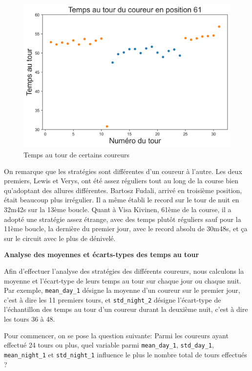 \documentclass[a4paper,12pt]{article}
\begin{document}
\begin{figure}[!h]
		\includegraphics[scale=0.45]{tempstour61}
	\caption{Temps au tour de certains coureurs}
\end{figure}

\medskip
On remarque que les stratégies sont différentes d'un coureur à l'autre. Les deux premiers, Lewis et Verys, ont été assez réguliers tout au long de la course bien qu'adoptant des allures différentes. Bartosz Fudali, arrivé en troisième position, était beaucoup plus irrégulier. Il a même établi le record sur le tour de nuit en 32m42s sur la 13ème boucle. Quant à Visa Kivinen, 61ème de la course, il a adopté une stratégie assez étrange, avec des temps plutôt réguliers sauf pour la 11ème boucle, la dernière du premier jour, avec le record absolu de 30m48s, et ça sur le circuit avec le plus de dénivelé.
\begin{center}
	\textbf{Analyse des moyennes et écarts-types des temps au tour}
\end{center}

Afin d'effectuer l'analyse des stratégies des différents coureurs, nous calculons la moyenne et l'écart-type de leurs temps au tour sur chaque jour ou chaque nuit. Par exemple, \texttt{mean\_day\_1} désigne la moyenne d'un coureur sur le premier jour, c'est à dire les 11 premiers tours, et \texttt{std\_night\_2} désigne l'écart-type de l'échantillon des temps au tour d'un coureur durant la deuxième nuit, c'est à dire les tours 36 à 48.
\medskip

Pour commencer, on se pose la question suivante: Parmi les coureurs ayant effectué 24 tours ou plus, quel variable parmi \texttt{mean\_day\_1}, \texttt{std\_day\_1}, \texttt{mean\_night\_1} et \texttt{std\_night\_1} influence le plus le nombre total de tours effectués ?
\end{document}
